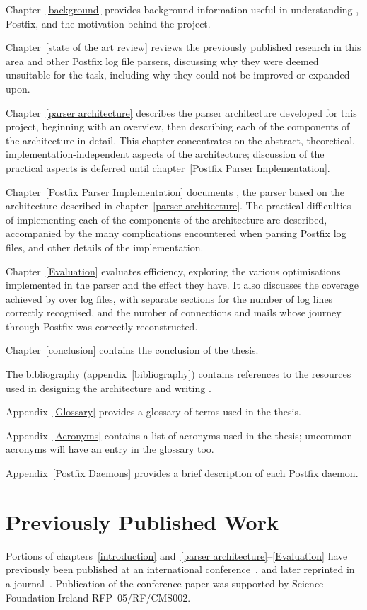 Chapter~\ref{background} provides background information useful in
understanding , Postfix, and the motivation behind the
project.

Chapter~\ref{state of the art review} reviews the previously published
research in this area and other Postfix log file parsers, discussing why
they were deemed unsuitable for the task, including why they could not be
improved or expanded upon.

Chapter~\ref{parser architecture} describes the parser architecture
developed for this project, beginning with an overview, then describing
each of the components of the architecture in detail.  This chapter
concentrates on the abstract, theoretical, implementation-independent
aspects of the architecture; discussion of the practical aspects is
deferred until chapter~\ref{Postfix Parser Implementation}.

Chapter~\ref{Postfix Parser Implementation} documents \parsername{}, the
parser based on the architecture described in chapter~\ref{parser
architecture}.  The practical difficulties of implementing each of the
components of the architecture are described, accompanied by the many
complications encountered when parsing Postfix log files, and other details
of the implementation.

Chapter~\ref{Evaluation} evaluates \parsernames{} efficiency, exploring
the various optimisations implemented in the parser and the effect they
have.  It also discusses the coverage achieved by \parsername{} over
\numberOFlogFILES{} log files, with separate sections for the number of log
lines correctly recognised, and the number of connections and mails whose
journey through Postfix was correctly reconstructed.

Chapter~\ref{conclusion} contains the conclusion of the thesis.

The bibliography (appendix~\ref{bibliography}) contains references to the
resources used in designing the architecture and writing \parsername{}.

Appendix~\ref{Glossary} provides a glossary of terms used in the thesis.

Appendix~\ref{Acronyms} contains a list of acronyms used in the thesis;
uncommon acronyms will have an entry in the glossary too.

Appendix~\ref{Postfix Daemons} provides a brief description of each Postfix
daemon.

\section{Previously Published Work}

Portions of chapters~\ref{introduction} and~\ref{parser
architecture}--\ref{Evaluation} have previously been published at an
international conference~\cite{sgai-2008}, and later reprinted in a
journal~\cite{elsevier-2009}.  Publication of the conference paper was
supported by Science Foundation Ireland RFP~05/RF/CMS002.
